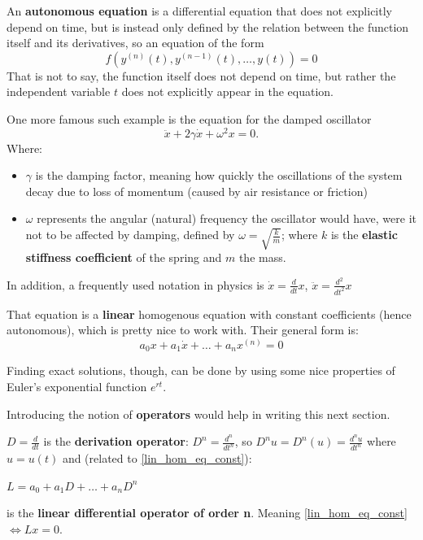 \begin{definition}
	An \textbf{autonomous equation} \cite{Hiroki2015} is a differential equation that does not explicitly depend on time, but is instead only defined by the relation between the function itself and its derivatives, so an equation of the form
	\begin{equation}\label{eq:3.2.3}
		f(y^{(n)}(t), y^{(n-1)}(t), \dots, y(t))= 0
	\end{equation}
	That is not to say, the function itself does not depend on time, but rather the independent variable $t$ does not explicitly appear in the equation.
\end{definition}

One more famous such example is the equation for the damped oscillator
\begin{equation}\label{eq:3.2.4}
	\ddot{x} + 2\gamma\dot{x} + \omega^2x = 0.
\end{equation}
Where:
\begin{itemize}
	\item $\gamma$ is the damping factor, meaning how quickly the oscillations of the system decay due to loss of momentum (caused by air resistance or friction)

	\item $\omega$ represents the angular (natural) frequency the oscillator would have, were it not to be affected by damping, defined by
		$\omega = \sqrt{\frac{k}{m}}$; where $k$ is the \textbf{elastic stiffness coefficient} of the spring and $m$ the mass.
\end{itemize}

In addition, a frequently used notation in physics is
$\dot{x} = \frac{d}{dt}x$, $\ddot{x}=\frac{d^2}{dt^2}x$

That equation is a \textbf{linear} homogenous equation with constant coefficients (hence autonomous), which is pretty nice to work with. Their general form is:
\begin{equation}\label{lin_hom_eq_const}
	a_0 x + a_1\dot{x}+ \dots +a_{n} x^{(n)} = 0
\end{equation}

Finding exact solutions, though, can be done by using some nice properties of Euler's exponential function $e^{rt}$.

Introducing the notion of \textbf{operators} would help in writing this next section.

\begin{definition}
	$D = \frac{d}{dt}$ is the \textbf{derivation operator}:
	$D^n = \frac{d^n}{dt^n}$, so $D^nu = D^n(u) =\frac{d^nu}{dt^n}$ where $u=u(t)$ and (related to \ref{lin_hom_eq_const}): \par
	\hspace{20pt} $L = a_0 + a_1D + \dots + a_nD^n$ \par
	\hspace{20pt} is the \textbf{linear differential operator of order n}. Meaning \ref{lin_hom_eq_const} $\iff Lx=0$.
\end{definition}

